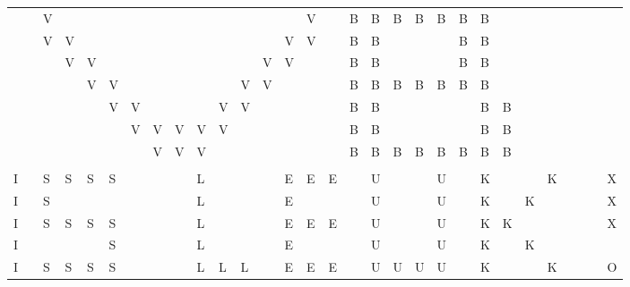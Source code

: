 
\begin{tabular}{lllllllllllllllllllllllllllll}
&&V&&&&&&&&&&&&V&&B&B&B&B&B&B&B&&&&&&&\\
&&V&V&&&&&&&&&&V&V&&B&B&&&&B&B&&&&&&&\\
&&&V&V&&&&&&&&V&V&&&B&B&&&&B&B&&&&&&&\\
&&&&V&V&&&&&&V&V&&&&B&B&B&B&B&B&B&&&&&&&\\
&&&&&V&V&&&&V&V&&&&&B&B&&&&&B&B&&&&&&\\
&&&&&&V&V&V&V&V&&&&&&B&B&&&&&B&B&&&&&&\\
&&&&&&&V&V&V&&&&&&&B&B&B&B&B&B&B&B&&&&&&\\
&&&&&&&&&&&&&&&&&&&&&&&&&&&\\
I&&S&S&S&S&&&&L&&&&E&E&E&&U&&&U&&K&&&K&&&&X\\
I&&S&&&&&&&L&&&&E&&&&U&&&U&&K&&K&&&&&X\\
I&&S&S&S&S&&&&L&&&&E&E&E&&U&&&U&&K&K&&&&&&X\\
I&&&&&S&&&&L&&&&E&&&&U&&&U&&K&&K&&&&&\\
I&&S&S&S&S&&&&L&L&L&&E&E&E&&U&U&U&U&&K&&&K&&&&O\\
\end{tabular}
